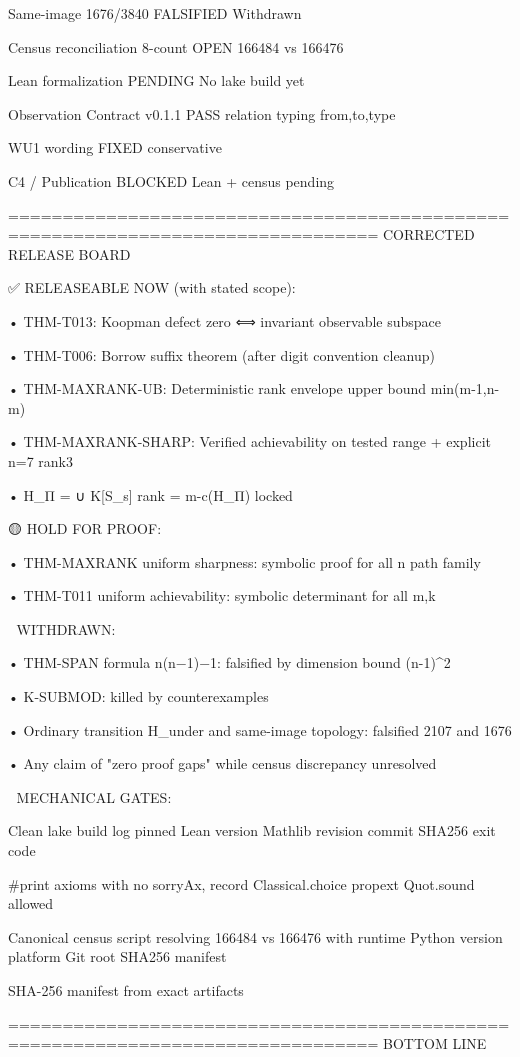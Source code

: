 Same-image 1676/3840 FALSIFIED Withdrawn

Census reconciliation 8-count OPEN 166484 vs 166476

Lean formalization PENDING No lake build yet

Observation Contract v0.1.1 PASS relation typing from,to,type

WU1 wording FIXED conservative

C4 / Publication BLOCKED Lean + census pending


================================================================================ CORRECTED RELEASE BOARD

✅ RELEASEABLE NOW (with stated scope):

• THM-T013: Koopman defect zero ⟺ invariant observable subspace

• THM-T006: Borrow suffix theorem (after digit convention cleanup)

• THM-MAXRANK-UB: Deterministic rank envelope upper bound min(m-1,n-m)

• THM-MAXRANK-SHARP: Verified achievability on tested range + explicit n=7 rank3

• H_Π = ∪ K[S_s] rank = m-c(H_Π) locked


🟡 HOLD FOR PROOF:

• THM-MAXRANK uniform sharpness: symbolic proof for all n path family

• THM-T011 uniform achievability: symbolic determinant for all m,k


🔴 WITHDRAWN:

• THM-SPAN formula n(n−1)−1: falsified by dimension bound (n-1)^2

• K-SUBMOD: killed by counterexamples

• Ordinary transition H_under and same-image topology: falsified 2107 and 1676

• Any claim of "zero proof gaps" while census discrepancy unresolved


🧾 MECHANICAL GATES:


Clean lake build log pinned Lean version Mathlib revision commit SHA256 exit code

#print axioms with no sorryAx, record Classical.choice propext Quot.sound allowed

Canonical census script resolving 166484 vs 166476 with runtime Python version platform Git root SHA256 manifest

SHA-256 manifest from exact artifacts

================================================================================ BOTTOM LINE

